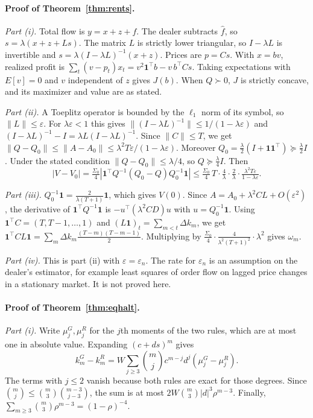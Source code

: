 \documentclass[12pt]{article}
\theoremstyle{definition}
\theoremstyle{remark}
\begin{document}
\paragraph{Proof of Theorem~\ref{thm:rents}.}
\emph{Part (i).} Total flow is $y=x+z+f$. The dealer subtracts $\hat f$, so $s=\lambda(x+z+Ls)$. The matrix $L$ is strictly lower triangular, so $I-\lambda L$ is invertible and $s=\lambda(I-\lambda L)^{-1}(x+z)$. Prices are $p=Cs$. With $x=bv$, realized profit is $\sum_t(v-p_t)x_t=v^2\mathbf1^\top b-v\,b^\top Cs$. Taking expectations with $E[v]=0$ and $v$ independent of $z$ gives $J(b)$. When $Q\succ0$, $J$ is strictly concave, and its maximizer and value are as stated.

\emph{Part (ii).} A Toeplitz operator is bounded by the $\ell_1$ norm of its symbol, so $\|L\|\le\varepsilon$. For $\lambda\varepsilon<1$ this gives $\|(I-\lambda L)^{-1}\|\le1/(1-\lambda\varepsilon)$ and $(I-\lambda L)^{-1}-I=\lambda L(I-\lambda L)^{-1}$. Since $\|C\|\le T$, we get $\|Q-Q_0\|\le\|A-A_0\|\le\lambda^2T\varepsilon/(1-\lambda\varepsilon)$. Moreover $Q_0=\tfrac\lambda2(I+\mathbf1\mathbf1^\top)\succeq\tfrac\lambda2I$. Under the stated condition $\|Q-Q_0\|\le\lambda/4$, so $Q\succeq\tfrac\lambda4I$. Then
\[
|V-V_0|=\tfrac{\Sigma_0}4|\mathbf1^\top Q^{-1}(Q_0-Q)Q_0^{-1}\mathbf1|\le\tfrac{\Sigma_0}4\,T\cdot\tfrac4\lambda\cdot\tfrac2\lambda\cdot\tfrac{\lambda^2T\varepsilon}{1-\lambda\varepsilon}.
\]

\emph{Part (iii).} $Q_0^{-1}\mathbf1=\frac{2}{\lambda(T+1)}\mathbf1$, which gives $V(0)$. Since $A=A_0+\lambda^2 C L+O(\varepsilon^2)$, the derivative of $\mathbf1^\top Q^{-1}\mathbf1$ is $-u^\top(\lambda^2CD)u$ with $u=Q_0^{-1}\mathbf1$. Using $\mathbf1^\top C=(T,T-1,\ldots,1)$ and $(L\mathbf1)_t=\sum_{m<t}\Delta k_m$, we get $\mathbf1^\top CL\mathbf1=\sum_m\Delta k_m\frac{(T-m)(T-m-1)}2$. Multiplying by $\tfrac{\Sigma_0}4\cdot\frac{4}{\lambda^2(T+1)^2}\cdot\lambda^2$ gives $\omega_m$.

\emph{Part (iv).} This is part (ii) with $\varepsilon=\varepsilon_n$. The rate for $\varepsilon_n$ is an assumption on the dealer's estimator, for example least squares of order flow on lagged price changes in a stationary market. It is not proved here.

\paragraph{Proof of Theorem~\ref{thm:eqhalt}.}
\emph{Part (i).} Write $\mu_j^G,\mu_j^R$ for the $j$th moments of the two rules, which are at most one in absolute value. Expanding $(c+ds)^m$ gives
\[
k_m^G-k_m^R=W\sum_{j\ge3}\binom mj c^{m-j}d^j(\mu_j^G-\mu_j^R).
\]
The terms with $j\le2$ vanish because both rules are exact for those degrees. Since $\binom mj\le\binom m3\binom{m-3}{j-3}$, the sum is at most $2W\binom m3|d|^3\rho^{m-3}$. Finally, $\sum_{m\ge3}\binom m3\rho^{m-3}=(1-\rho)^{-4}$.
\end{document}
